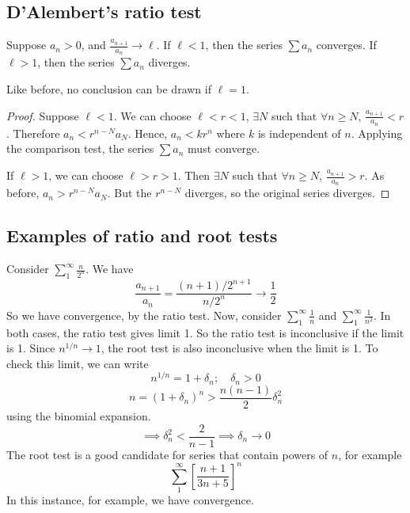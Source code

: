 \subsection{D'Alembert's ratio test}
\begin{theorem}
	Suppose \(a_n > 0\), and \(\frac{a_{n+1}}{a_n} \to \ell\).
	If \(\ell < 1\), then the series \(\sum a_n\) converges.
	If \(\ell > 1\), then the series \(\sum a_n\) diverges.
\end{theorem}
\begin{remark}
	Like before, no conclusion can be drawn if \(\ell = 1\).
\end{remark}
\begin{proof}
	Suppose \(\ell < 1\).
	We can choose \(\ell < r < 1\), \(\exists N\) such that \(\forall n \geq N\), \(\frac{a_{n+1}}{a_n} < r\).
	Therefore \(a_n < r^{n-N} a_N\).
	Hence, \(a_n < k r^n\) where \(k\) is independent of \(n\).
	Applying the comparison test, the series \(\sum a_n\) must converge.

	If \(\ell > 1\), we can choose \(\ell > r > 1\).
	Then \(\exists N\) such that \(\forall n \geq N\), \(\frac{a_{n+1}}{a_n} > r\).
	As before, \(a_n > r^{n-N} a_N\).
	But the \(r^{n-N}\) diverges, so the original series diverges.
\end{proof}

\subsection{Examples of ratio and root tests}
Consider \(\sum_1^\infty \frac{n}{2^n}\).
We have
\[
	\frac{a_{n+1}}{a_n} = \frac{(n+1)/2^{n+1}}{n/2^n} \to \frac{1}{2}
\]
So we have convergence, by the ratio test.
Now, consider \(\sum_1^\infty \frac{1}{n}\) and \(\sum_1^\infty \frac{1}{n^2}\).
In both cases, the ratio test gives limit 1.
So the ratio test is inconclusive if the limit is 1.
Since \(n^{1/n} \to 1\), the root test is also inconclusive when the limit is 1.
To check this limit, we can write
\[
	n^{1/n} = 1 + \delta_n;\quad \delta_n > 0
\]
\[
	n = (1 + \delta_n)^n > \frac{n(n-1)}{2}\delta_n^2
\]
using the binomial expansion.
\[
	\implies \delta_n^2 < \frac{2}{n-1} \implies \delta_n \to 0
\]
The root test is a good candidate for series that contain powers of \(n\), for example
\[
	\sum_1^\infty \left[ \frac{n+1}{3n+5} \right]^n
\]
In this instance, for example, we have convergence.

